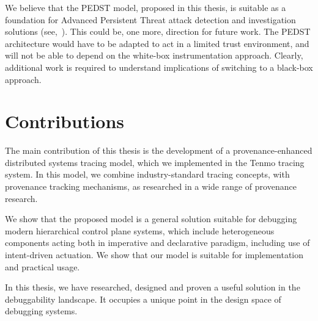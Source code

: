 We believe that the PEDST model, proposed in this thesis, is suitable as a foundation for Advanced Persistent Threat attack detection and investigation solutions (see,~\cite{apt-daly2009}). This could be, one more, direction for future work. The PEDST architecture would have to be adapted to act in a limited trust environment, and will not be able to depend on the white-box instrumentation approach. Clearly, additional work is required to understand implications of switching to a black-box approach.

\section{Contributions}

The main contribution of this thesis is the development of a provenance-enhanced distributed systems tracing model, which we implemented in the Tenmo tracing system. In this model, we combine industry-standard tracing concepts, with provenance tracking mechanisms, as researched in a wide range of provenance research.

We show that the proposed model is a general solution suitable for debugging modern hierarchical control plane systems, which include heterogeneous components acting both in imperative and declarative paradigm, including use of intent-driven actuation. We show that our model is suitable for implementation and practical usage.

In this thesis, we have researched, designed and proven a useful solution in the debuggability landscape. It occupies a unique point in the design space of debugging systems.

